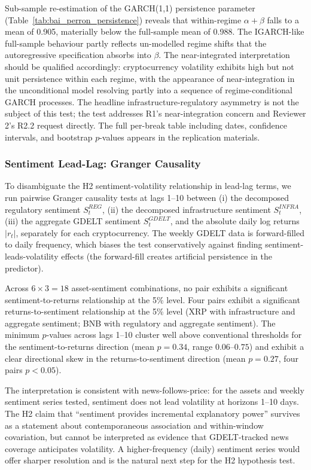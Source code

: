 \documentclass[pdflatex,sn-mathphys-num]{sn-jnl}
\theoremstyle{thmstyleone}
\theoremstyle{thmstyletwo}
\theoremstyle{thmstylethree}
\begin{document}
Sub-sample re-estimation of the GARCH(1,1) persistence parameter (Table~\ref{tab:bai_perron_persistence}) reveals that within-regime $\alpha + \beta$ falls to a mean of 0.905, materially below the full-sample mean of 0.988. The IGARCH-like full-sample behaviour partly reflects un-modelled regime shifts that the autoregressive specification absorbs into $\beta$. The near-integrated interpretation should be qualified accordingly: cryptocurrency volatility exhibits high but not unit persistence within each regime, with the appearance of near-integration in the unconditional model resolving partly into a sequence of regime-conditional GARCH processes. The headline infrastructure-regulatory asymmetry is not the subject of this test; the test addresses R1's near-integration concern and Reviewer 2's R2.2 request directly. The full per-break table including dates, confidence intervals, and bootstrap $p$-values appears in the replication materials.

\subsubsection{Sentiment Lead-Lag: Granger Causality}\label{sec:granger}

To disambiguate the H2 sentiment-volatility relationship in lead-lag terms, we run pairwise Granger causality tests at lags 1--10 between (i) the decomposed regulatory sentiment $S^{REG}_t$, (ii) the decomposed infrastructure sentiment $S^{INFRA}_t$, (iii) the aggregate GDELT sentiment $S^{GDELT}_t$, and the absolute daily log returns $|r_t|$, separately for each cryptocurrency. The weekly GDELT data is forward-filled to daily frequency, which biases the test conservatively against finding sentiment-leads-volatility effects (the forward-fill creates artificial persistence in the predictor).

Across $6 \times 3 = 18$ asset-sentiment combinations, no pair exhibits a significant sentiment-to-returns relationship at the 5\% level. Four pairs exhibit a significant returns-to-sentiment relationship at the 5\% level (XRP with infrastructure and aggregate sentiment; BNB with regulatory and aggregate sentiment). The minimum $p$-values across lags 1--10 cluster well above conventional thresholds for the sentiment-to-returns direction (mean $p = 0.34$, range $0.06$--$0.75$) and exhibit a clear directional skew in the returns-to-sentiment direction (mean $p = 0.27$, four pairs $p < 0.05$).

The interpretation is consistent with news-follows-price: for the assets and weekly sentiment series tested, sentiment does not lead volatility at horizons 1--10 days. The H2 claim that ``sentiment provides incremental explanatory power'' survives as a statement about contemporaneous association and within-window covariation, but cannot be interpreted as evidence that GDELT-tracked news coverage anticipates volatility. A higher-frequency (daily) sentiment series would offer sharper resolution and is the natural next step for the H2 hypothesis test.
\end{document}
